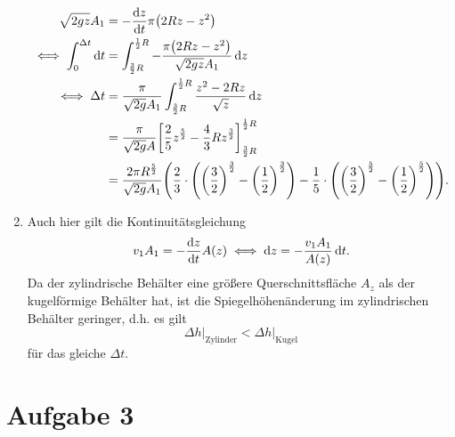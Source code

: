 \documentclass{exercise}
\begin{document}
\begin{enumerate}
\begin{align*}
            \sqrt{2gz} A_1 &= -\frac{\d z}{\d t}\pi\parentheses*{2Rz - z^2}\\
            \iff \int_0^{\Delta t}\d t &= \int_{\frac{3}{2}R}^{\frac{1}{2}R}-\frac{\pi\parentheses*{2Rz - z^2}}{\sqrt{2gz}A_1}\d z\\
            \iff \Delta t &= \frac{\pi}{\sqrt{2g}A_1}\int_{\frac{3}{2}R}^{\frac{1}{2}R}\frac{z^2 - 2Rz}{\sqrt{z}}\d z\\
            &= \frac{\pi}{\sqrt{2g}A}\brackets*{\frac{2}{5}z^{\frac{5}{2}} - \frac{4}{3}Rz^{\frac{3}{2}}}_{\frac{3}{2}R}^{\frac{1}{2}R}\\
            &= \frac{2\pi R^{\frac{5}{2}}}{\sqrt{2g}A_1}\parentheses*{\frac{2}{3} \cdot \parentheses*{\parentheses*{\frac{3}{2}}^{\frac{3}{2}} - \parentheses*{\frac{1}{2}}^{\frac{3}{2}}} - \frac{1}{5} \cdot \parentheses*{\parentheses*{\frac{3}{2}}^{\frac{5}{2}} - \parentheses*{\frac{1}{2}}^{\frac{5}{2}}}}.
        \end{align*}
        \item Auch hier gilt die Kontinuitätsgleichung
        \[
            v_1 A_1 = -\frac{\d z}{\d t}A\parentheses*{z} \iff \d z = -\frac{v_1 A_1}{A\parentheses*{z}}\d t.
        \]
        Da der zylindrische Behälter eine größere Querschnittsfläche \(A_z\) als der kugelförmige Behälter hat, ist die Spiegelhöhenänderung im zylindrischen Behälter geringer, d.h. es gilt
        \[
            \left.\Delta h\right|_{\text{Zylinder}} < \left.\Delta h\right|_{\text{Kugel}}
        \]
        für das gleiche \(\Delta t\).
    \end{enumerate}


    \section*{Aufgabe 3}
    
\end{document}
